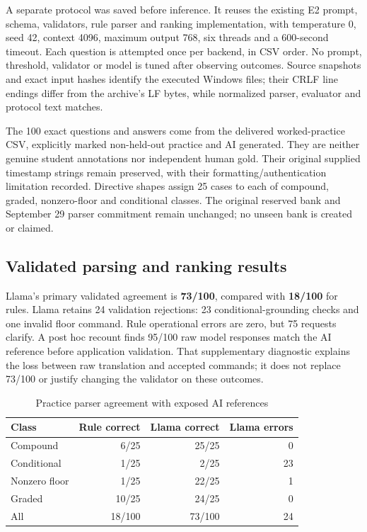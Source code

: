 \documentclass[conference]{IEEEtran}
\begin{document}
A separate protocol was saved before inference. It reuses the existing E2 prompt, schema, validators, rule parser and ranking implementation, with temperature 0, seed 42, context 4096, maximum output 768, six threads and a 600-second timeout. Each question is attempted once per backend, in CSV order. No prompt, threshold, validator or model is tuned after observing outcomes. Source snapshots and exact input hashes identify the executed Windows files; their CRLF line endings differ from the archive's LF bytes, while normalized parser, evaluator and protocol text matches.

The 100 exact questions and answers come from the delivered worked-practice CSV, explicitly marked non-held-out practice and AI generated. They are neither genuine student annotations nor independent human gold. Their original supplied timestamp strings remain preserved, with their formatting/authentication limitation recorded. Directive shapes assign 25 cases to each of compound, graded, nonzero-floor and conditional classes. The original reserved bank and September 29 parser commitment remain unchanged; no unseen bank is created or claimed.

\subsection{Validated parsing and ranking results}
Llama's primary validated agreement is \textbf{73/100}, compared with \textbf{18/100} for rules. Llama retains 24 validation rejections: 23 conditional-grounding checks and one invalid floor command. Rule operational errors are zero, but 75 requests clarify. A post hoc recount finds 95/100 raw model responses match the AI reference before application validation. That supplementary diagnostic explains the loss between raw translation and accepted commands; it does not replace 73/100 or justify changing the validator on these outcomes.

\begin{table}[t]\centering\small
\caption{Practice parser agreement with exposed AI references}
\begin{tabular}{lrrr}\toprule
Class&Rule correct&Llama correct&Llama errors\\\midrule
Compound&6/25&25/25&0\\
Conditional&1/25&2/25&23\\
Nonzero floor&1/25&22/25&1\\
Graded&10/25&24/25&0\\\midrule
All&18/100&73/100&24\\\bottomrule
\end{tabular}\end{table}
\end{document}
